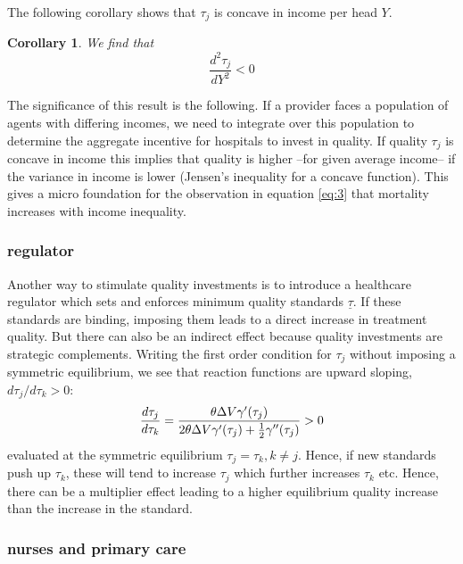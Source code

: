 \documentclass[12pt,english,a4paper]{article}
\newtheorem{corollary}{Corollary}
\begin{document}
The following corollary shows that \(\tau_j\) is concave in income per head \(Y\).

\begin{corollary}
\label{cor:tauY}
We find that
\begin{equation}
\label{eq:23}
\frac{d^2 \tau_j}{dY^2} < 0
\end{equation}
\end{corollary}

The significance of this result is the following. If a provider faces a population of agents with differing incomes, we need to integrate over this population to determine the aggregate incentive for hospitals to invest in quality. If quality \(\tau_j\) is concave in income this implies that quality is higher --for given average income-- if the variance in income is lower (Jensen's inequality for a concave function). This gives a micro foundation for the observation in equation \eqref{eq:3} that mortality increases with income inequality.

\subsubsection{regulator}
\label{sec:orga73183f}

Another way to stimulate quality investments is to introduce a healthcare regulator which sets and enforces minimum quality standards \(\underline \tau\). If these standards are binding, imposing them leads to a direct increase in treatment quality. But there can also be an indirect effect because quality investments are strategic complements. Writing the first order condition for \(\tau_j\) without imposing a symmetric equilibrium, we see that reaction functions are upward sloping, \(d \tau_j/d \tau_k > 0\):
\begin{equation}
\label{eq:28}
\frac{d\tau_j}{d\tau_k} = \frac{\theta \Delta V \gamma'(\tau_j)}{2\theta\Delta V \gamma'(\tau_j) + \textstyle{1\over 2} \gamma''(\tau_j)} > 0
\end{equation}
evaluated at the symmetric equilibrium \(\tau_j=\tau_k, k \neq j\). Hence, if new standards push up \(\tau_k\), these will tend to increase \(\tau_j\) which further increases \(\tau_k\) etc. Hence, there can be a multiplier effect leading to a higher equilibrium quality increase than the increase in the standard.

\subsubsection{nurses and primary care}
\label{sec:org3da68e6}
\end{document}
